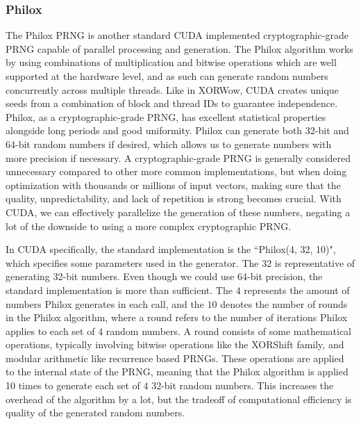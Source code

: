 \documentclass{article}
\begin{document}
            \subsubsection{Philox}
The Philox PRNG is another standard CUDA implemented cryptographic-grade PRNG capable of parallel processing and generation. The Philox algorithm works by using combinations of multiplication and bitwise operations which are well supported at the hardware level, and as such can generate random numbers concurrently across multiple threads. Like in XORWow, CUDA creates unique seeds from a combination of block and thread IDs to guarantee independence. Philox, as a cryptographic-grade PRNG, has excellent statistical properties alongside long periods and good uniformity. Philox can generate both 32-bit and 64-bit random numbers if desired, which allows us to generate numbers with more precision if necessary. A cryptographic-grade PRNG is generally considered unnecessary compared to other more common implementations, but when doing optimization with thousands or millions of input vectors, making sure that the quality, unpredictability, and lack of repetition is strong becomes crucial. With CUDA, we can effectively parallelize the generation of these numbers, negating a lot of the downside to using a more complex cryptographic PRNG. 

In CUDA specifically, the standard implementation is the ``Philox(4, 32, 10)", which specifies some parameters used in the generator. The $32$ is representative of generating 32-bit numbers. Even though we could use 64-bit precision, the standard implementation is more than sufficient. The $4$ represents the amount of numbers Philox generates in each call, and the $10$ denotes the number of rounds in the Philox algorithm, where a round refers to the number of iterations Philox applies to each set of $4$ random numbers. A round consists of some mathematical operations, typically involving bitwise operations like the XORShift family, and modular arithmetic like recurrence based PRNGs. These operations are applied to the internal state of the PRNG, meaning that the Philox algorithm is applied 10 times to generate each set of $4$ 32-bit random numbers. This increases the overhead of the algorithm by a lot, but the tradeoff of computational efficiency is quality of the generated random numbers.
\end{document}
